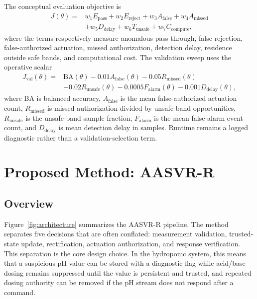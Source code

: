 \documentclass[preprint,12pt,doubleblind]{elsarticle}
\begin{document}
The conceptual evaluation objective is
\begin{equation}
\begin{aligned}
J(\theta)=&
w_1E_{\mathrm{pass}}+w_2E_{\mathrm{reject}}+w_3A_{\mathrm{false}}
+w_4A_{\mathrm{missed}} \\
&+w_5D_{\mathrm{delay}}+w_6T_{\mathrm{unsafe}}+w_7C_{\mathrm{compute}},
\end{aligned}
\end{equation}
where the terms respectively measure anomalous pass-through, false rejection, false-authorized actuation, missed authorization, detection delay, residence outside safe bands, and computational cost. The validation sweep uses the operative scalar
\begin{equation}
\begin{aligned}
J_{\mathrm{val}}(\theta)=&
\mathrm{BA}(\theta)
-0.01A_{\mathrm{false}}(\theta)
-0.05R_{\mathrm{missed}}(\theta)\\
&-0.02R_{\mathrm{unsafe}}(\theta)
-0.0005F_{\mathrm{alarm}}(\theta)
-0.001D_{\mathrm{delay}}(\theta),
\end{aligned}
\label{eq:validation_objective}
\end{equation}
where BA is balanced accuracy, $A_{\mathrm{false}}$ is the mean false-authorized actuation count, $R_{\mathrm{missed}}$ is missed authorization divided by unsafe-band opportunities, $R_{\mathrm{unsafe}}$ is the unsafe-band sample fraction, $F_{\mathrm{alarm}}$ is the mean false-alarm event count, and $D_{\mathrm{delay}}$ is mean detection delay in samples. Runtime remains a logged diagnostic rather than a validation-selection term.

\section{Proposed Method: AASVR-R}
\subsection{Overview}
Figure~\ref{fig:architecture} summarizes the AASVR-R pipeline. The method separates five decisions that are often conflated: measurement validation, trusted-state update, rectification, actuation authorization, and response verification. This separation is the core design choice. In the hydroponic system, this means that a suspicious pH value can be stored with a diagnostic flag while acid/base dosing remains suppressed until the value is persistent and trusted, and repeated dosing authority can be removed if the pH stream does not respond after a command.
\end{document}
